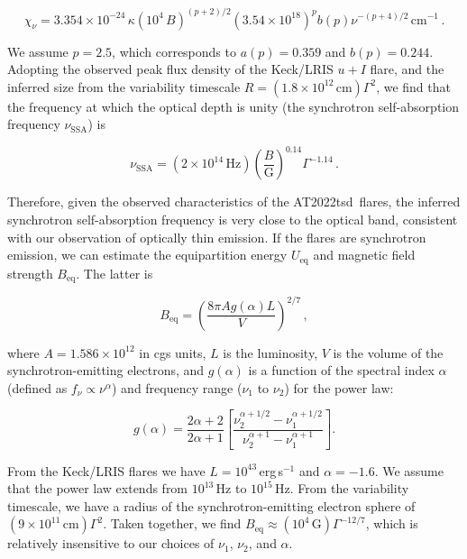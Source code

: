 \documentclass{nature_plusfigure}
\newcommand{\at}{AT2022tsd}
\begin{document}
\begin{methods}
\begin{equation}
\label{eq:synchrotron-tau}
\chi_\nu = 3.354\times10^{-24}\, \kappa (10^4\,B)^{(p+2)/2} (3.54\times10^{18})^p b(p) \nu^{-(p+4)/2}\,\mathrm{cm}^{-1}\, .
\end{equation}

We assume $p=2.5$, which corresponds to\cite{Longair2011} $a(p)=0.359$ and $b(p)=0.244$. Adopting the observed peak flux density of the Keck/LRIS $u+I$ flare, and the inferred size from the variability timescale $R=(1.8\times10^{12}\,\mathrm{cm})\Gamma^2$, we find that the frequency at which the optical depth is unity (the synchrotron self-absorption frequency $\nu_\mathrm{SSA}$) is

\begin{equation}
\label{eq:ssa}
\nu_\mathrm{SSA} = (2\times10^{14}\,\mathrm{Hz}) \left(\frac{B}{\mathrm{G}} \right)^{0.14} \Gamma^{-1.14}\, .
\end{equation}

\noindent Therefore, given the observed characteristics of the \at\ flares, the inferred synchrotron self-absorption frequency is very close to the optical band, consistent with our observation of optically thin emission.
If the flares are synchrotron emission, we can  
estimate the equipartition energy $U_\mathrm{eq}$ and magnetic field strength $B_\mathrm{eq}$. The latter is\cite{Moffet1975}

\begin{equation}
B_\mathrm{eq} = \left( \frac{8\pi A g(\alpha) L}{V} \right)^{2/7}\, ,
\end{equation}

\noindent where $A=1.586\times10^{12}$ in cgs units, $L$ is the luminosity, $V$ is the volume of the synchrotron-emitting electrons, and $g(\alpha)$ is a function of the spectral index $\alpha$ (defined as $f_\nu\propto \nu^{\alpha}$) and frequency range ($\nu_1$ to $\nu_2$) for the power law:

\begin{equation}
    g(\alpha) = \frac{2\alpha+2}{2\alpha+1} 
    \left[ \frac{\nu_2^{\alpha+1/2}-\nu_1^{\alpha+1/2}}{\nu_2^{\alpha+1}-\nu_1^{\alpha+1}} \right].
\end{equation}

From the Keck/LRIS flares we have $L=10^{43}\,$erg\,s$^{-1}$ and $\alpha=-1.6$.
We assume that the power law extends from 
$10^{13}$\,Hz to $10^{15}$\,Hz.
From the variability timescale, we have a radius of the synchrotron-emitting electron sphere of $(9\times10^{11}\,\mathrm{cm})\Gamma^2$.
Taken together, we find $B_\mathrm{eq}\approx(10^{4}\,\mathrm{G})\Gamma^{-12/7}$, which is relatively insensitive to our choices of $\nu_1$, $\nu_2$, and $\alpha$.


\end{methods}
\end{document}
